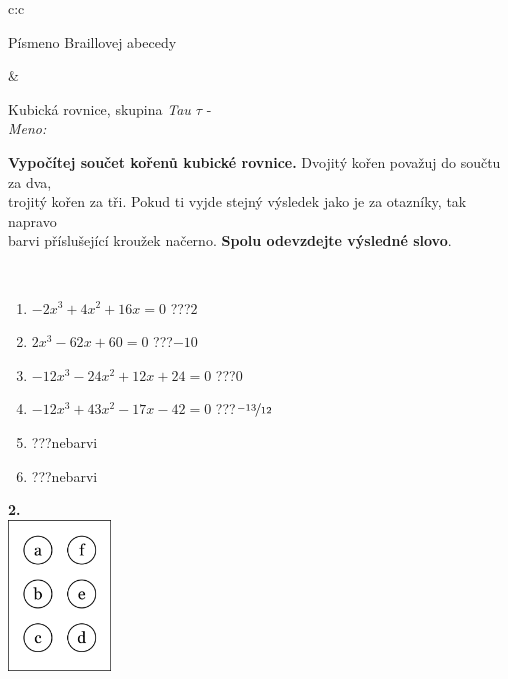 \documentclass[10pt]{report}
\begin{document}
\begin{tabular}{c:c}
\begin{minipage}[c][104.5mm][t]{0.5\linewidth}
\begin{center}
\begin{minipage}{0.20\linewidth}
\begin{center}
{\small Písmeno Braillovej abecedy}
\end{center}
\end{minipage}
\end{center}
\end{minipage}
&
\begin{minipage}[c][104.5mm][t]{0.5\linewidth}
\begin{center}
\vspace{7mm}
{\huge Kubická rovnice, skupina \textit{Tau $\tau$} -}\\[5mm]
\textit{Meno:}\phantom{xxxxxxxxxxxxxxxxxxxxxxxxxxxxxxxxxxxxxxxxxxxxxxxxxxxxxxxxxxxxxxxxx}\\[5mm]
\begin{minipage}{0.95\linewidth}
\textbf{Vypočítej součet kořenů kubické rovnice.} Dvojitý kořen považuj do součtu za dva,\\trojitý kořen za tři. Pokud ti vyjde stejný výsledek jako je za otazníky, tak napravo\\barvi příslušející kroužek načerno. \textbf{Spolu odevzdejte výsledné slovo}.
\end{minipage}
\\[1mm]
\begin{minipage}{0.79\linewidth}
\begin{center}
\begin{varwidth}{\linewidth}
\begin{enumerate}
\Large
\item $-2x^3+4x^2+16x=0$\quad \dotfill\; ???\;\dotfill \quad $2$
\item $2x^3-62x+60=0$\quad \dotfill\; ???\;\dotfill \quad $-10$
\item $-12x^3-24x^2+12x+24=0$\quad \dotfill\; ???\;\dotfill \quad $0$
\item $-12x^3+43x^2-17x-42=0$\quad \dotfill\; ???\;\dotfill \quad $\nicefrac{-13}{12}$
\item \quad \dotfill\; ???\;\dotfill \quad nebarvi
\item \quad \dotfill\; ???\;\dotfill \quad nebarvi
\end{enumerate}
\end{varwidth}
\end{center}
\end{minipage}
\begin{minipage}{0.20\linewidth}
\begin{center}
{\Huge\bfseries 2.} \\[2mm]
\includegraphics[height=40mm]{../images/braille.png}

\end{center}
\end{minipage}
\end{center}
\end{minipage}
\end{tabular}
\end{document}
